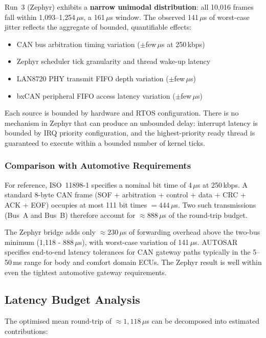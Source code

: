 \documentclass[11pt,a4paper]{article}
\begin{document}
Run~3 (Zephyr) exhibits a \textbf{narrow unimodal distribution}: all 10{,}016 frames fall
within 1{,}093--1{,}254\,$\mu$s, a 161\,$\mu$s window.  The observed 141\,$\mu$s of
worst-case jitter reflects the aggregate of bounded, quantifiable effects:

\begin{itemize}
    \item CAN bus arbitration timing variation ($\pm$few\,$\mu$s at 250\,kbps)
    \item Zephyr scheduler tick granularity and thread wake-up latency
    \item LAN8720 PHY transmit FIFO depth variation ($\pm$few\,$\mu$s)
    \item bxCAN peripheral FIFO access latency variation ($\pm$few\,$\mu$s)
\end{itemize}

Each source is bounded by hardware and RTOS configuration.  There is no mechanism in
Zephyr that can produce an unbounded delay: interrupt latency is bounded by IRQ priority
configuration, and the highest-priority ready thread is guaranteed to execute within a
bounded number of kernel ticks.

\subsubsection{Comparison with Automotive Requirements}

For reference, ISO~11898-1 specifies a nominal bit time of 4\,$\mu$s at 250\,kbps.
A standard 8-byte CAN frame (SOF + arbitration + control + data + CRC + ACK + EOF)
occupies at most 111 bit times $= 444\,\mu$s.  Two such transmissions (Bus~A and Bus~B)
therefore account for $\approx 888\,\mu$s of the round-trip budget.

The Zephyr bridge adds only $\approx 230\,\mu$s of forwarding overhead above the
two-bus minimum (1{,}118 - 888\,$\mu$s), with worst-case variation of 141\,$\mu$s.
AUTOSAR~\cite{autosar} specifies end-to-end latency tolerances for CAN gateway paths
typically in the 5--50\,ms range for body and comfort domain ECUs.  The Zephyr result
is well within even the tightest automotive gateway requirements.

\subsection{Latency Budget Analysis}

The optimised mean round-trip of $\approx 1{,}118\,\mu$s can be decomposed
into estimated contributions:
\end{document}
